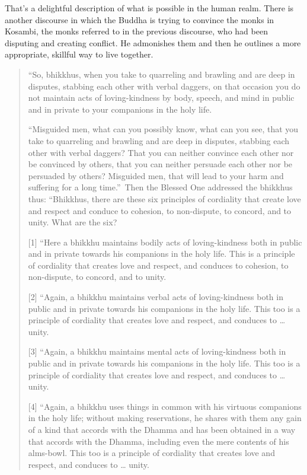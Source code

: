 That’s a delightful description of what is possible in the human realm.
There is another discourse in which the Buddha is trying to convince the
monks in Kosambi, the monks referred to in the previous discourse, who
had been disputing and creating conflict. He admonishes them and then he
outlines a more appropriate, skillful way to live together.

\begin{quotation}
“So, bhikkhus, when you take to quarreling and brawling and are deep in
disputes, stabbing each other with verbal daggers, on that occasion you
do not maintain acts of loving-kindness by body, speech, and mind in
public and in private to your companions in the holy life.

“Misguided men, what can you possibly know, what can you see, that you
take to quarreling and brawling and are deep in disputes, stabbing each
other with verbal daggers? That you can neither convince each other nor
be convinced by others, that you can neither persuade each other nor be
persuaded by others? Misguided men, that will lead to your harm and
suffering for a long time.”~Then the Blessed One addressed the bhikkhus
thus: “Bhikkhus, there are these six principles of cordiality that
create love and respect and conduce to cohesion, to non-dispute, to
concord, and to unity. What are the six?

{[}1{]} “Here a bhikkhu maintains bodily acts of loving-kindness both in
public and in private towards his companions in the holy life. This is a
principle of cordiality that creates love and respect, and conduces to
cohesion, to non-dispute, to concord, and to unity.

{[}2{]} “Again, a bhikkhu maintains verbal acts of loving-kindness both
in public and in private towards his companions in the holy life. This
too is a principle of cordiality that creates love and respect, and
conduces to \ldots{} unity.

{[}3{]} “Again, a bhikkhu maintains mental acts of loving-kindness both
in public and in private towards his companions in the holy life. This
too is a principle of cordiality that creates love and respect, and
conduces to \ldots{} unity.

{[}4{]} “Again, a bhikkhu uses things in common with his virtuous
companions in the holy life; without making reservations, he shares with
them any gain of a kind that accords with the Dhamma and has been
obtained in a way that accords with the Dhamma, including even the mere
contents of his alms-bowl. This too is a principle of cordiality that
creates love and respect, and conduces to \ldots{} unity.


\end{quotation}
